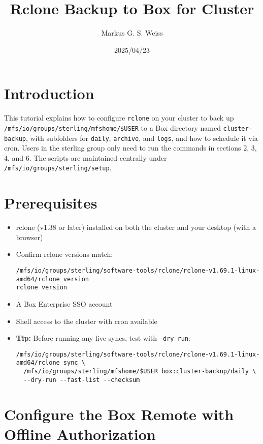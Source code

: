 \documentclass[12pt,letterpaper]{article}
\title{\LARGE Rclone Backup to Box for Cluster}
\author{Markus G. S. Weiss}
\date{2025/04/23}
\begin{document}
\maketitle

\tableofcontents
\newpage

\section{Introduction}

This tutorial explains how to configure \texttt{rclone} on your cluster to back up \texttt{/mfs/io/groups/sterling/mfshome/\$USER} to a Box directory named \texttt{cluster-backup}, with subfolders for \texttt{daily}, \texttt{archive}, and \texttt{logs}, and how to schedule it via cron. Users in the sterling group only need to run the commands in sections 2, 3, 4, and 6. The scripts are maintained centrally under \texttt{/mfs/io/groups/sterling/setup}.

\section{Prerequisites}

\begin{itemize}
  \item rclone (v1.38 or later) installed on both the cluster and your desktop (with a browser)
  \item Confirm rclone versions match:
    \begin{lstlisting}[style=custombash]
/mfs/io/groups/sterling/software-tools/rclone/rclone-v1.69.1-linux-amd64/rclone version
rclone version
    \end{lstlisting}
  \item A Box Enterprise SSO account
  \item Shell access to the cluster with cron available
  \item \textbf{Tip:} Before running any live syncs, test with \texttt{--dry-run}:
    \begin{lstlisting}[style=custombash]
/mfs/io/groups/sterling/software-tools/rclone/rclone-v1.69.1-linux-amd64/rclone sync \
  /mfs/io/groups/sterling/mfshome/$USER box:cluster-backup/daily \
  --dry-run --fast-list --checksum
    \end{lstlisting}
\end{itemize}

\section{Configure the Box Remote with Offline Authorization}
\end{document}
